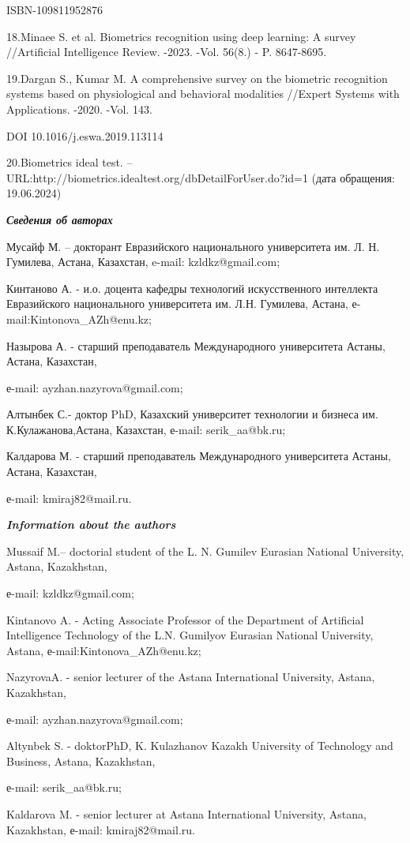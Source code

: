 ISBN-109811952876

18.Minaee S. et al. Biometrics recognition using deep learning: A survey
//Artificial Intelligence Review. -2023. -Vol. 56(8.) - P. 8647-8695.

19.Dargan S., Kumar M. A comprehensive survey on the biometric
recognition systems based on physiological and behavioral modalities
//Expert Systems with Applications. -2020. -Vol. 143.

DOI 10.1016/j.eswa.2019.113114

20.Biometrics ideal test.
--URL:http://biometrics.idealtest.org/dbDetailForUser.do?id=1 (дата
обращения: 19.06.2024)

\emph{\textbf{Сведения об авторах}}

Мусайф М. -- докторант Евразийского национального университета им. Л. Н.
Гумилева, Астана, Казахстан, e-mail: kzldkz@gmail.com;

Кинтаново А. - и.о. доцента кафедры технологий искусственного интеллекта
Евразийского национального университета им. Л.Н. Гумилева, Астана,
е-mail:Kintonova\_AZh@enu.kz;

Назырова А. - старший преподаватель Международного университета Астаны,
Астана, Казахстан,

е-mail: ayzhan.nazyrova@gmail.com;

Алтынбек С.- доктор PhD, Казахский университет технологии и бизнеса им.
К.Кулажанова,Астана, Казахстан, е-mail: serik\_aa@bk.ru;

Калдарова М. - старший преподаватель Международного университета Астаны,
Астана, Казахстан,

е-mail: kmiraj82@mail.ru.

\emph{\textbf{Information about the authors}}

Mussaif M.-- doctorial student of the L. N. Gumilev Eurasian National
University, Astana, Kazakhstan,

е-mail: kzldkz@gmail.com;

Kintanovo A. - Acting Associate Professor of the Department of
Artificial Intelligence Technology of the L.N. Gumilyov Eurasian
National University, Astana, е-mail:Kintonova\_AZh@enu.kz;

NazyrovaA. - senior lecturer of the Astana International University,
Astana, Kazakhstan,

е-mail: ayzhan.nazyrova@gmail.com;

Altynbek S. - doktorPhD, K. Kulazhanov Kazakh University of Technology
and Business, Astana, Kazakhstan,

е-mail: serik\_aa@bk.ru;

Kaldarova M. - senior lecturer at Astana International University,
Astana, Kazakhstan, е-mail: kmiraj82@mail.ru.
